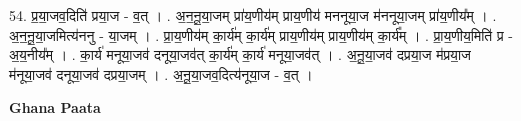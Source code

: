 \documentclass[17pt]{extarticle}
\begin{document}
54. प्र॒या॒जव॒दिति॑ प्रया॒ज - व॒त् । . अ॒न॒नू॒या॒जम् प्रा॑य॒णीय॑म् प्राय॒णीय॑ मननूया॒ज म॑ननूया॒जम् प्रा॑य॒णीय᳚म् । . अ॒न॒नू॒या॒जमित्य॑ननु - या॒जम् । . प्रा॒य॒णीय॑म् का॒र्य॑म् का॒र्य॑म् प्राय॒णीय॑म् प्राय॒णीय॑म् का॒र्य᳚म् । . प्रा॒य॒णीय॒मिति॑ प्र - अ॒य॒नीय᳚म् । . का॒र्य॑ मनूया॒जव॑ दनूया॒जव॑त् का॒र्य॑म् का॒र्य॑ मनूया॒जव॑त् । . अ॒नू॒या॒जव॑ दप्रया॒ज म॑प्रया॒ज म॑नूया॒जव॑ दनूया॒जव॑ दप्रया॒जम् । . अ॒नू॒या॒जव॒दित्य॑नूया॒ज - व॒त् । \newline

\textbf{Ghana Paata } \newline
\end{document}
